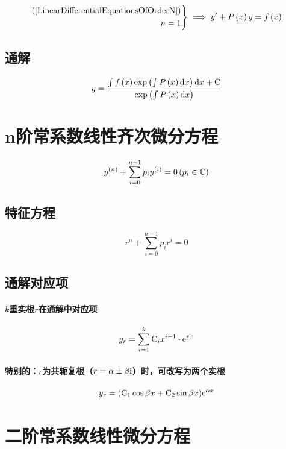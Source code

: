 \documentclass{article}
\begin{document}
\begin{definition}
    \[\left.\begin{aligned}
            \left(\ref{LinearDifferentialEquationsOfOrderN}\right) \\
            n=1
        \end{aligned}\right\}
        \implies
        y^\prime+P\left(x\right)y=f\left(x\right)\]
\end{definition}

\subsection{通解}

\[y=\frac{\int{f\left(x\right)\exp\left(\int P\left(x\right)\mathrm dx\right)\mathrm dx}+\mathrm C}{\exp\left(\int P\left(x\right)\mathrm d x\right)}\]

\section{n阶常系数线性齐次微分方程}

\begin{definition}[]
    \[y^{\left(n\right)}+\sum_{i=0}^{n-1}p_iy^{\left(i\right)}=0\left(p_i\in\mathbb C\right)\]
\end{definition}

\subsection{特征方程}

\[r^n+\sum_{i=0}^{n-1}p_ir^i=0\]

\subsection{通解对应项}

\paragraph{$k$重实根$r$在通解中对应项}

\[y_r=\sum_{i=1}^k\mathrm C_ix^{i-1}\cdot\mathrm e^{rx}\]

\paragraph{特别的：$r$为共轭复根（$r=\alpha\pm\beta\mathrm i$）时，可改写为两个实根}

\[y_r=(\mathrm C_1\cos{\beta x}+\mathrm C_2\sin{\beta x})\mathrm e^{\alpha x}\]

\section{二阶常系数线性微分方程}
\end{document}
